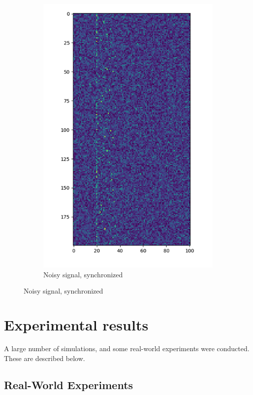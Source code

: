 \documentclass[a4paper]{article}
\begin{document}
\begin{figure}[H]
\begin{subfigure}[b]{0.45\textwidth}
        \includegraphics[width=1\textwidth]{waterfall_sync_noisy.png}
        \caption{Noisy signal, synchronized}
    \end{subfigure}
\end{figure}

\section{Experimental results}

A large number of simulations, and some real-world experiments were
conducted. These are described below.

\subsection{Real-World Experiments}
\end{document}
